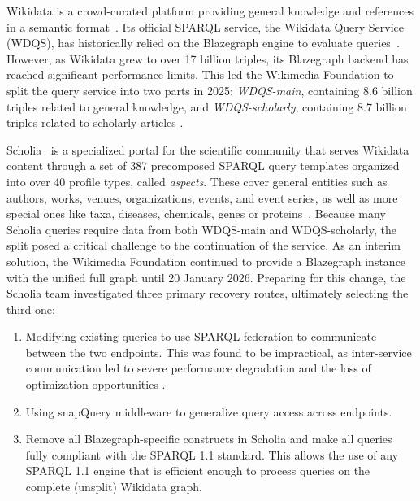 \documentclass{ceurart}
\begin{document}
Wikidata is a crowd-curated platform providing general knowledge and references in a semantic format~\cite{Vrandecic2014}. Its official SPARQL service, the Wikidata Query Service (WDQS), has historically relied on the Blazegraph engine to evaluate queries~\cite{malyshev2018getting}. However, as Wikidata grew to over 17 billion triples, its Blazegraph backend has reached significant performance limits. This led the Wikimedia Foundation to split the query service into two parts in 2025: \emph{WDQS-main}, containing 8.6 billion triples related to general knowledge, and \emph{WDQS-scholarly}, containing 8.7 billion triples related to scholarly articles \cite{lubiana2024wdqs}.

Scholia~\cite{Nielsen_Scholia_Scientometrics_and_2017} is a specialized portal for the scientific community that 
serves
Wikidata content through a set of 387 precomposed SPARQL query templates organized into over 40 profile types, called \emph{aspects}. These cover general entities such as authors, works, venues, organizations, events, and event series, as well as more special ones like taxa, diseases, chemicals, genes or proteins~\cite{Willighagen2025}. Because many Scholia queries require data from both WDQS-main and WDQS-scholarly, the split posed a critical challenge to the continuation of the service. As an interim solution, the Wikimedia Foundation continued to provide a Blazegraph instance with the unified full graph until 
20 January 2026.
% 
Preparing for this change, the Scholia team investigated three primary recovery routes, 
ultimately selecting the third one:
\begin{enumerate}
    \item Modifying existing queries to use SPARQL federation to communicate between the two endpoints. This was found to be impractical, as inter-service communication led to severe performance degradation and the loss of optimization opportunities \cite{lubiana2024wdqs}. 
    \item Using snapQuery middleware \cite{Fahl_SnapQuery_2025} to generalize query access across endpoints.
    \item Remove all Blazegraph-specific constructs in Scholia and make all queries fully compliant with the SPARQL 1.1 standard. This allows the use of any SPARQL 1.1 engine that is efficient enough to process queries on the complete (unsplit) Wikidata graph.
\end{enumerate}
% 
\end{document}
